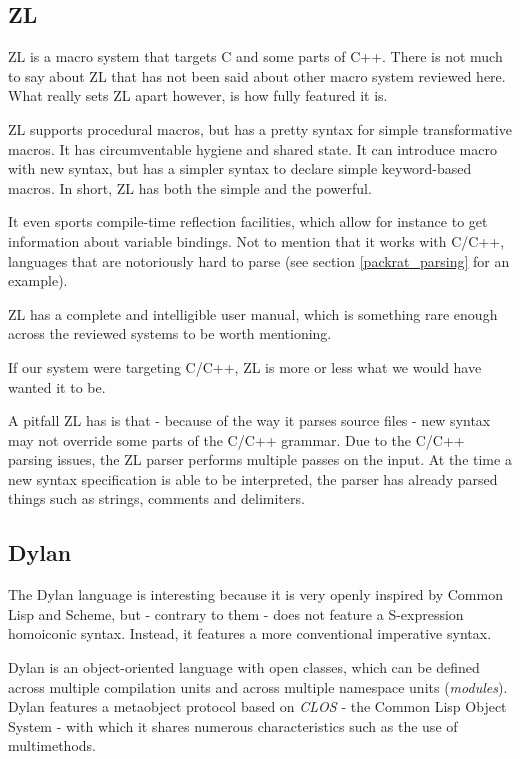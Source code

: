 \subsection{ZL}

ZL \cite{ZL} is a macro system that targets C and some parts of C++. There is
not much to say about ZL that has not been said about other macro system
reviewed here. What really sets ZL apart however, is how fully featured it is.

ZL supports procedural macros, but has a pretty syntax for simple transformative
macros. It has circumventable hygiene and shared state. It can introduce macro
with new syntax, but has a simpler syntax to declare simple keyword-based
macros. In short, ZL has both the simple and the powerful.

It even sports compile-time reflection facilities, which allow for instance to
get information about variable bindings. Not to mention that it works with
C/C++, languages that are notoriously hard to parse (see section
\ref{packrat_parsing} for an example).

ZL has a complete and intelligible user manual, which is something rare enough
across the reviewed systems to be worth mentioning.

If our system were targeting C/C++, ZL is more or less what we would have wanted
it to be.

A pitfall ZL has is that - because of the way it parses source files - new
syntax may not override some parts of the C/C++ grammar. Due to the C/C++
parsing issues, the ZL parser performs multiple passes on the input. At the time
a new syntax specification is able to be interpreted, the parser has already
parsed things such as strings, comments and delimiters.

\subsection{Dylan}

The Dylan language is interesting because it is very openly inspired by Common
Lisp and Scheme, but - contrary to them - does not feature a S-expression
homoiconic syntax. Instead, it features a more conventional imperative syntax.

Dylan is an object-oriented language with open classes, which can be defined
across multiple compilation units and across multiple namespace units
(\emph{modules}). Dylan features a metaobject protocol based on \emph{CLOS} -
the Common Lisp Object System - with which it shares numerous characteristics
such as the use of multimethods.

